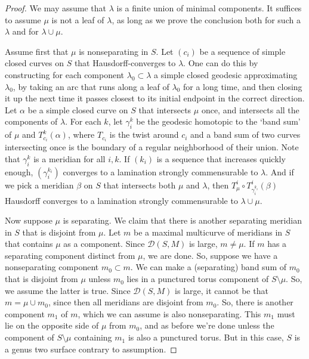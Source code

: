 \documentclass[12pt]{amsart}
\theoremstyle{definition}
\theoremstyle{remark}
\begin{document}
 \begin{proof}
 We may assume that $\lambda$ is a finite union of minimal components. It suffices to assume $\mu$ is not a leaf of $\lambda$, as long as we prove the conclusion both for such a $\lambda$ and for $\lambda\cup \mu$.


\medskip

Assume first that $\mu$ is nonseparating in $S$. Let $(c_i)$ be a sequence of simple closed curves on $S$ that Hausdorff-converges to $\lambda$. One can do this by constructing for each component $\lambda_0 \subset \lambda$ a simple closed geodesic approximating $\lambda_0$, by taking an arc that runs along a leaf of $\lambda_0$ for a long time, and then closing it up the next time it passes closest to its initial endpoint in the correct direction. Let $\alpha$ be a simple closed curve on $S$ that intersects $\mu$ once, and intersects all the components of $\lambda$. For each $k$, let $\gamma_i^k$ be the geodesic homotopic to the `band sum' of $\mu$ and $T_{c_i}^k(\alpha)$, where $T_{c_i}$ is the twist around $c_i$ and a band sum of two curves intersecting once is the boundary of a regular neighborhood of their union. Note that $\gamma_i^k$ is a meridian for all $i,k$. If $(k_i)$ is a sequence that increases quickly enough, $(\gamma_i^{k_i})$ converges to a lamination strongly commensurable to $\lambda$. And if we pick a meridian $\beta$ on $S$ that intersects both $\mu$ and $\lambda$, then $T_\mu^i \circ T_{\gamma_i^{k_i}}^i(\beta)$ Hausdorff converges to a lamination strongly commensurable to $\lambda\cup \mu$. 

Now suppose $\mu$ is separating. We claim that there is another separating meridian in $S$ that is disjoint from $\mu$. Let $m$ be a maximal multicurve of meridians in $S$ that contains $\mu$ as a component. Since $\mathcal D(S,M)$ is large, $m\neq \mu$. If $m$ has a separating component distinct from $\mu$, we are done. So, suppose we have a nonseparating component $m_0 \subset m$. We can make a (separating) band sum of $m_0$ that is disjoint from $\mu$ unless $m_0$ lies in a punctured  torus component of $S \setminus \mu$. So, we assume the latter is true. Since $\mathcal D(S,M)$ is large, it cannot be that $m=\mu \cup m_0$, since then all meridians are disjoint from $m_0$. So, there is another component $m_1$ of $m$, which we can assume is also nonseparating. This $m_1$ must lie on the opposite side of $\mu$ from $m_0$, and as before we're done unless the component of $S\setminus \mu$ containing $m_1$ is also a punctured torus. But in this case, $S$ is a genus two surface contrary to assumption.


\end{proof}
\end{document}
